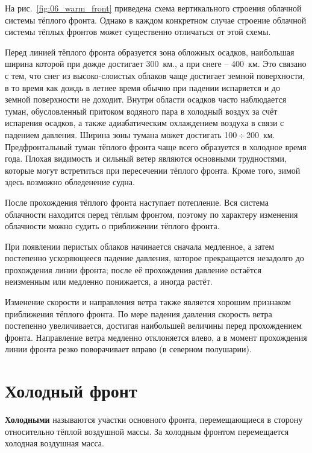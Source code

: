 \documentclass[a4paper, 12pt, twoside, final, book, russian, fittopage, cyremdash, openright]{ncc}
\newcommand{\otdo}{\,\ensuremath{\div}\,}
\begin{document}
На рис.~\ref{fig:06_warm_front} приведена схема вертикального строения
облачной системы тёплого фронта. Однако в каждом конкретном случае
строение облачной системы тёплых фронтов может существенно отличаться
от этой схемы.

Перед линией тёплого фронта образуется зона обложных
осадков, наибольшая ширина которой при
дожде достигает 300~км., а при снеге \--- 400~км. Это связано с тем,
что снег из высоко-слоистых облаков чаще достигает земной поверхности,
в то время как дождь в летнее время обычно при падении испаряется и до
земной поверхности не доходит. Внутри области осадков часто
наблюдается туман, обусловленный притоком водяного пара в холодный
воздух за счёт испарения осадков, а также адиабатическим охлаждением
воздуха в связи с падением давления. Ширина зоны тумана может
достигать 100\otdo{}200~км. Предфронтальный туман тёплого фронта чаще
всего образуется в холодное время года. Плохая видимость и сильный
ветер являются основными трудностями, которые могут встретиться при
пересечении тёплого фронта. Кроме того, зимой здесь возможно
обледенение судна.

После прохождения тёплого фронта наступает потепление. Вся система
облачности находится перед тёплым фронтом, поэтому по характеру
изменения облачности можно судить о приближении тёплого фронта.

При появлении перистых облаков начинается сначала медленное, а затем
постепенно ускоряющееся падение давления, которое прекращается
незадолго до прохождения линии фронта; после её прохождения давление
остаётся неизменным или медленно понижается, а иногда растёт.

Изменение скорости и направления ветра также является хорошим
признаком приближения тёплого фронта. По мере падения давления
скорость ветра постепенно увеличивается, достигая наибольшей величины
перед прохождением фронта. Направление ветра медленно отклоняется
влево, а в момент прохождения линии фронта резко поворачивает вправо
(в северном полушарии).

\section{Холодный фронт}
\label{sec:cold_front}

\textbf{Холодными} называются участки основного фронта, перемещающиеся в
сторону относительно тёплой воздушной массы. За холодным фронтом
перемещается холодная воздушная масса.
\end{document}
